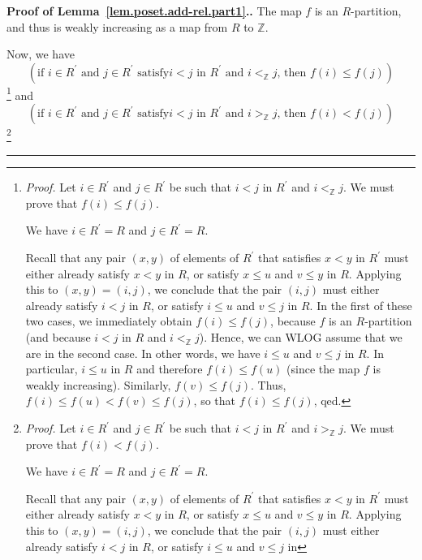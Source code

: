 \documentclass[numbers=enddot,12pt,final,onecolumn,notitlepage]{scrartcl}%
\theoremstyle{definition}
\newenvironment{proof}[1][Proof]{\noindent\textbf{#1.} }{\ \rule{0.5em}{0.5em}}
\newenvironment{verlong}{}{}
\newcommand{\ZZ}{\mathbb{Z}}
\begin{document}
\begin{verlong}
\begin{proof}[Proof of Lemma~\ref{lem.poset.add-rel.part1}.]
The map $f$ is an $R$-partition, and thus is weakly increasing as a map from
$R$ to $\mathbb{Z}$.

Now, we have%
\[
\left(  \text{if }i\in R^{\prime}\text{ and }j\in R^{\prime}\text{ satisfy
}i<j\text{ in }R^{\prime}\text{ and }i<_{\ZZ}j\text{, then }f\left(
i\right)  \leq f\left(  j\right)  \right)
\]
\footnote{\textit{Proof.} Let $i\in R^{\prime}$ and $j\in R^{\prime}$ be such
that $i<j$ in $R^\prime$ and $i<_{\ZZ}j$. We must prove that $f\left(
i\right)  \leq f\left(  j\right)  $.
\par
We have $i\in R^{\prime}=R$ and $j\in R^{\prime}=R$.
\par
Recall that any pair $\left(  x,y\right)  $ of elements of $R^{\prime}$ that
satisfies $x<y$ in $R^{\prime}$ must either already satisfy $x<y$ in $R$, or
satisfy $x\leq u$ and $v\leq y$ in $R$. Applying this to $\left(  x,y\right)
=\left(  i,j\right)  $, we conclude that the pair $\left(  i,j\right)  $ must
either already satisfy $i<j$ in $R$, or satisfy $i\leq u$ and $v\leq j$ in
$R$. In the first of these two cases, we immediately obtain $f\left(
i\right)  \leq f\left(  j\right)  $, because $f$ is an $R$-partition (and
because $i<j$ in $R$ and $i<_{\ZZ}j$). Hence, we can WLOG assume that
we are in the second case. In other words, we have $i\leq u$ and $v\leq j$ in
$R$. In particular, $i\leq u$ in $R$ and therefore $f\left(  i\right)  \leq
f\left(  u\right)  $ (since the map $f$ is weakly increasing). Similarly,
$f\left(  v\right)  \leq f\left(  j\right)  $. Thus, $f\left(  i\right)  \leq
f\left(  u\right)  <f\left(  v\right)  \leq f\left(  j\right)  $, so that
$f\left(  i\right)  \leq f\left(  j\right)  $, qed.} and%
\[
\left(  \text{if }i\in R^{\prime}\text{ and }j\in R^{\prime}\text{ satisfy
}i<j\text{ in }R^{\prime}\text{ and }i>_{\ZZ}j\text{, then }f\left(
i\right)  <f\left(  j\right)  \right)
\]
\footnote{\textit{Proof.} Let $i\in R^{\prime}$ and $j\in R^{\prime}$ be such
that $i<j$ in $R^\prime$ and $i>_{\ZZ}j$. We must prove that $f\left(
i\right)  <f\left(  j\right)  $.
\par
We have $i\in R^{\prime}=R$ and $j\in R^{\prime}=R$.
\par
Recall that any pair $\left(  x,y\right)  $ of elements of $R^{\prime}$ that
satisfies $x<y$ in $R^{\prime}$ must either already satisfy $x<y$ in $R$, or
satisfy $x\leq u$ and $v\leq y$ in $R$. Applying this to $\left(  x,y\right)
=\left(  i,j\right)  $, we conclude that the pair $\left(  i,j\right)  $ must
either already satisfy $i<j$ in $R$, or satisfy $i\leq u$ and $v\leq j$ in
}
\end{proof}
\end{verlong}
\end{document}
